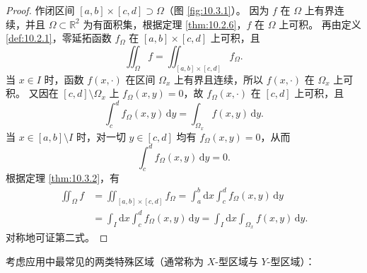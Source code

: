 \begin{proof}
作闭区间 $[a, b] \times [c, d] \supset \Omega$（图 \ref{fig:10.3.1}）。
因为 $f$ 在 $\Omega$ 上有界连续，并且 $\Omega \subset \mathbb{R}^2$ 为有面积集，根据定理 \ref{thm:10.2.6}，$f$ 在 $\Omega$ 上可积。
再由定义 \ref{def:10.2.1}，零延拓函数 $f_\Omega$ 在 $[a, b] \times [c, d]$ 上可积，且
\[
\iint_\Omega f = \iint_{[a, b] \times [c, d]} f_\Omega.
\]
当 $x \in I$ 时，函数 $f(x, \cdot)$ 在区间 $\Omega_x$ 上有界且连续，所以 $f(x, \cdot)$ 在 $\Omega_x$ 上可积。
又因在 $[c, d] \setminus \Omega_x$ 上 $f_\Omega(x, y) = 0$，故 $f_\Omega(x, \cdot)$ 在 $[c, d]$ 上可积，且
\[
\int_c^d f_\Omega(x, y)\,\mathrm{d}y = \int_{\Omega_x} f(x, y)\,\mathrm{d}y.
\]
当 $x \in [a, b] \setminus I$ 时，对一切 $y \in [c, d]$ 均有 $f_\Omega(x, y) = 0$，从而
\[
\int_c^d f_\Omega(x, y)\,\mathrm{d}y = 0.
\]
根据定理 \ref{thm:10.3.2}，有
\begin{align*}
\iint_\Omega f &= \iint_{[a, b] \times [c, d]} f_\Omega = \int_a^b \mathrm{d}x \int_c^d f_\Omega(x, y)\,\mathrm{d}y \\
&= \int_I \mathrm{d}x \int_c^d f_\Omega(x, y)\,\mathrm{d}y = \int_I \mathrm{d}x \int_{\Omega_x} f(x, y)\,\mathrm{d}y.
\end{align*}
对称地可证第二式。
\end{proof}

考虑应用中最常见的两类特殊区域（通常称为 $X$-型区域与 $Y$-型区域）：

